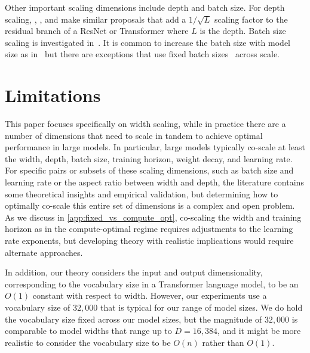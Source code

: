 \documentclass{article}
\theoremstyle{plain}
\theoremstyle{definition}
\theoremstyle{remark}
\begin{document}
Other important scaling dimensions include depth and batch size. For depth scaling, \citet{yang2023tensorvi}, \citet{bordelon2023depthwise}, and \citet{chizat2023steering} make similar proposals that add a $1/\sqrt{L}$ scaling factor to the residual branch of a ResNet or Transformer where $L$ is the depth. Batch size scaling is investigated in~\citep{shallue2019measuring,mccandlish2018empirical,zhang2019algorithmic,kaplan2020scaling}. It is common to increase the batch size with model size as in~\citep{brown2020gpt3,rae2021gopher,hoffmann2022training,chowdhery2023palm,workshop2022bloom,dey2023cerebras,bi2024deepseek} but there are exceptions that use fixed batch sizes~\citep{thoppilan2022lamda,touvron2023llama,touvron2023llama2} across scale.






\section{Limitations}
This paper focuses specifically on width scaling, while in practice there are a number of dimensions that need to scale in tandem to achieve optimal performance in large models. In particular, large models typically co-scale at least the width, depth, batch size, training horizon, weight decay, and learning rate. For specific pairs or subsets of these scaling dimensions, such as batch size and learning rate or the aspect ratio between width and depth, the literature contains some theoretical insights and empirical validation, but determining how to optimally co-scale this entire set of dimensions is a complex and open problem. As we discuss in \cref{app:fixed_vs_compute_opt}, co-scaling the width and training horizon as in the compute-optimal regime requires adjustments to the learning rate exponents, but developing theory with realistic implications would require alternate approaches.

In addition, our theory considers the input and output dimensionality, corresponding to the vocabulary size in a Transformer language model, to be an $O(1)$ constant with respect to width. However, our experiments use a vocabulary size of $32{,}000$ that is typical for our range of model sizes. We do hold the vocabulary size fixed across our model sizes, but the magnitude of $32{,}000$ is comparable to model widths that range up to $D=16{,}384$, and it might be more realistic to consider the vocabulary size to be $O(n)$ rather than $O(1)$.
\end{document}
